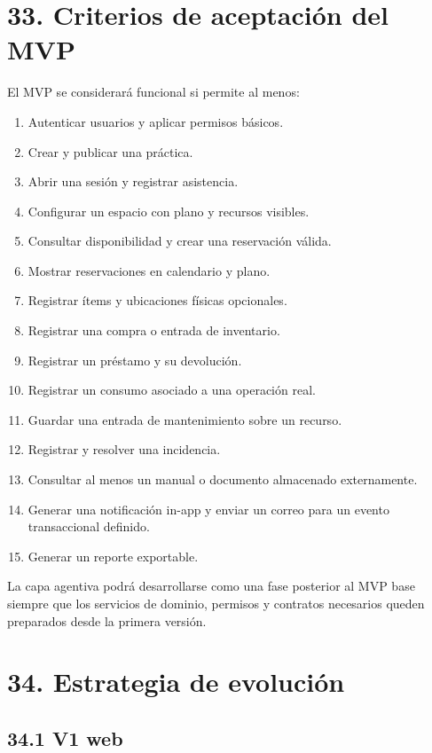 \documentclass[12pt]{article}
\begin{document}
\section*{33. Criterios de aceptación del MVP}

El MVP se considerará funcional si permite al menos:

\begin{enumerate}[leftmargin=1.2cm]
    \item Autenticar usuarios y aplicar permisos básicos.
    \item Crear y publicar una práctica.
    \item Abrir una sesión y registrar asistencia.
    \item Configurar un espacio con plano y recursos visibles.
    \item Consultar disponibilidad y crear una reservación válida.
    \item Mostrar reservaciones en calendario y plano.
    \item Registrar ítems y ubicaciones físicas opcionales.
    \item Registrar una compra o entrada de inventario.
    \item Registrar un préstamo y su devolución.
    \item Registrar un consumo asociado a una operación real.
    \item Guardar una entrada de mantenimiento sobre un recurso.
    \item Registrar y resolver una incidencia.
    \item Consultar al menos un manual o documento almacenado externamente.
    \item Generar una notificación in-app y enviar un correo para un evento transaccional definido.
    \item Generar un reporte exportable.
\end{enumerate}

La capa agentiva podrá desarrollarse como una fase posterior al MVP base siempre que los servicios de dominio, permisos y contratos necesarios queden preparados desde la primera versión.

\section*{34. Estrategia de evolución}

\subsection*{34.1 V1 web}
\end{document}
